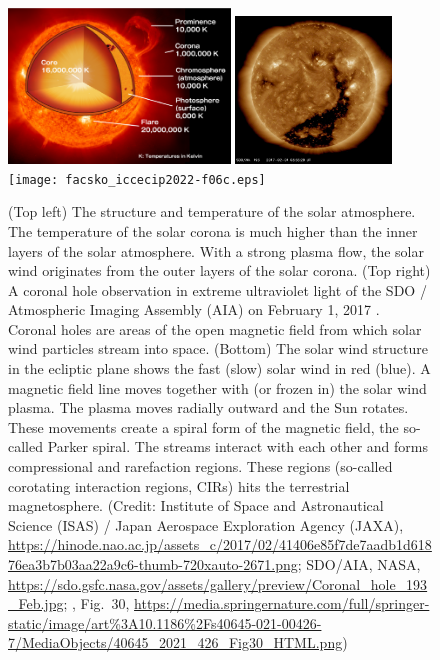\documentclass[sn-aps]{sn-jnl}%
\begin{document}
\begin{figure}[h]
\centering
\includegraphics[width=0.525\textwidth]{facsko_iccecip2022-f06a.eps}
\includegraphics[width=0.37\textwidth]{facsko_iccecip2022-f06b.eps}
\texttt{[image: facsko\_iccecip2022-f06c.eps]}
\caption{(Top left) The structure and temperature of the solar atmosphere. The temperature of the solar corona is much higher than the inner layers of the solar atmosphere. With a strong plasma flow, the solar wind originates from the outer layers of the solar corona. (Top right) A coronal hole observation in extreme ultraviolet light of the SDO / Atmospheric Imaging Assembly (AIA) on February 1, 2017 \cite{pesnell12:_solar_dynam_obser_sdo,lemen12:_atmos_imagin_assem_aia_solar}.  Coronal holes are areas of the open magnetic field from which solar wind particles stream into space. (Bottom) The solar wind structure in the ecliptic plane shows the fast (slow) solar wind in red (blue). A magnetic field line moves together with (or frozen in) the solar wind plasma. The plasma moves radially outward and the Sun rotates. These movements create a spiral form of the magnetic field, the so-called Parker spiral. The streams interact with each other and forms compressional and rarefaction regions. These regions (so-called corotating interaction regions, CIRs) hits the terrestrial magnetosphere. (Credit: Institute of Space and Astronautical Science (ISAS) / Japan Aerospace Exploration Agency (JAXA), \url{https://hinode.nao.ac.jp/assets_c/2017/02/41406e85f7de7aadb1d61876ea3b7b03aa22a9c6-thumb-720xauto-2671.png}; SDO/AIA, NASA, \url{https://sdo.gsfc.nasa.gov/assets/gallery/preview/Coronal_hole_193_Feb.jpg}; \cite{zhang21:_earth}, Fig.~30, \url{https://media.springernature.com/full/springer-static/image/art\%3A10.1186\%2Fs40645-021-00426-7/MediaObjects/40645\_2021\_426\_Fig30\_HTML.png})}\label{fig:corona}
\end{figure}
\end{document}
